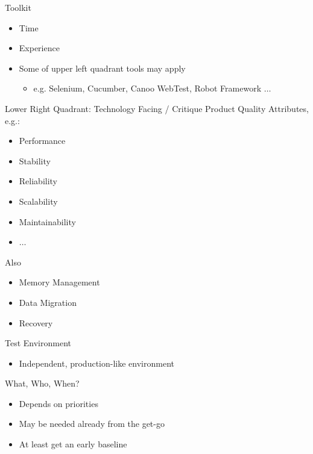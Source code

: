 \documentclass[10pt,t,a4paper]{beamer}
\begin{document}
\begin{frame}[label=sec-11]{Toolkit}
\begin{itemize}
\item Time
\item Experience
\item Some of upper left quadrant tools may apply
\begin{itemize}
\item e.g. Selenium, Cucumber, Canoo WebTest, Robot Framework $\ldots$
\end{itemize}
\end{itemize}
\end{frame}
\begin{frame}[label=sec-12]{Lower Right Quadrant: Technology Facing / Critique Product}
Quality Attributes, e.g.:
\begin{itemize}
\item Performance
\item Stability
\item Reliability
\item Scalability
\item Maintainability
\item $\ldots$
\end{itemize}

Also
\begin{itemize}
\item Memory Management
\item Data Migration
\item Recovery
\end{itemize}

Test Environment
\begin{itemize}
\item Independent, production-like environment
\end{itemize}
\end{frame}
\begin{frame}[label=sec-13]{What, Who, When?}
\begin{itemize}
\item Depends on priorities
\item May be needed already from the get-go
\item At least get an early baseline
\end{itemize}
\end{frame}
\end{document}
